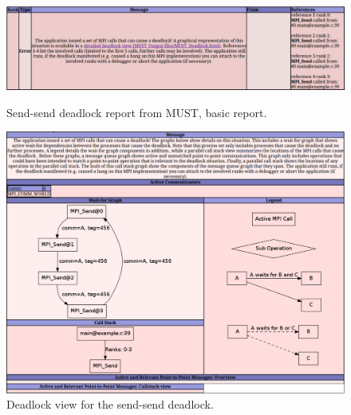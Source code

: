 \documentclass[english]{scrartcl}
\begin{document}
\begin{figure}[tp]
  \centering
  \includegraphics[angle=0,width=0.99\linewidth]{outputdeadlock.pdf}
  \caption{Send-send deadlock report from MUST, basic report.}
  \label{result-deadlock}
  \includegraphics[angle=0,width=0.99\linewidth]{deadlock.pdf}
  \caption{Deadlock view for the send-send deadlock.}
  \label{result-deadlock-dot}
\end{figure}
\end{document}
